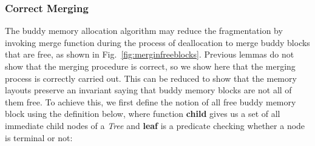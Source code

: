 \subsubsection{Correct Merging}
%
%
%

The buddy memory allocation algorithm may reduce the fragmentation by invoking merge function during the process of deallocation to merge buddy blocks that are free, as shown in Fig.~\ref{fig:merginfreeblocks}. Previous lemmas do not show that the merging procedure is correct, so we show here that the merging process is correctly carried out. This can be reduced to show that the memory layouts preserve an invariant saying that buddy memory blocks are not all of them free. To achieve this, we first define the notion of all free buddy memory block using the definition below, where function \textbf{child} gives us a set of all immediate child nodes of a \emph{Tree} and \textbf{leaf} is a predicate checking whether a node is terminal or not:


